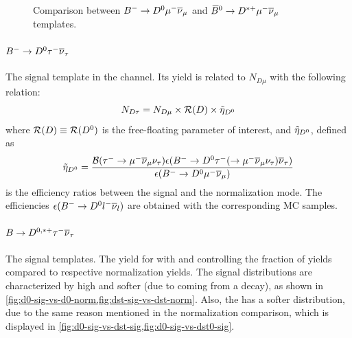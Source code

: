 \begin{figure}[!htb]
    \caption{
        Comparison between ${{{B}^-}} \rightarrow {\ensuremath{{D}^0}}{\ensuremath{\mu^-}}{\ensuremath{{\overline{\nu}}_\mu}}$ and
        ${{\kern 0.18em\overline{\kern -0.18em B}}{}^0} \rightarrow {\ensuremath{{D}^{*+}}}{\ensuremath{\mu^-}}{\ensuremath{{\overline{\nu}}_\mu}}$ templates.
    }
    \label{fig:d0-norm-vs-dst-norm}
\end{figure}

\paragraph{${{{B}^-}} \rightarrow {\ensuremath{{D}^0}}{\ensuremath{\tau^-}}{\ensuremath{{\overline{\nu}}_\tau}}$}
The signal template in the \Dz channel.
Its yield is related to $N_{D\mu}$ with the following relation:
\begin{equation}
    N_{D\tau} = N_{D\mu} \times \mathcal{R}(D) \times \tilde{\eta}_{{{D}^0}}
\end{equation}
where $\mathcal{R}(D) \equiv \mathcal{R}({{D}^0})$ is the free-floating parameter of interest,
and $\tilde{\eta}_{{{D}^0}}$, defined as
\begin{equation}
    \tilde{\eta}_{\Dz} = \frac{
        \mathcal{B}(\taum \rightarrow \mun\neumb\neut)
        \epsilon{(\Bm \rightarrow \Dz \taum (\rightarrow \mun\neumb\neut) \neutb)}
    }{
        \epsilon({\Bm \rightarrow \Dz \mun \neumb})
    }
\end{equation}
is the efficiency ratios between the signal and the normalization mode.
The efficiencies $\epsilon({{{{B}^-}} \rightarrow {\ensuremath{{D}^0}} {\ensuremath{l^-}} {\ensuremath{{\overline{\nu}}_l}}})$ are
obtained with the corresponding MC samples.

\paragraph{$B \rightarrow D^{0,*+}{\tau^-}{{\overline{\nu}}_\tau}$}
The signal templates.
The yield for
with \RD and \RDstp controlling the fraction
of yields compared to respective normalization yields.
The signal distributions are characterized by high \mmSq and softer
\el (due to \muon coming from a \tauon decay),
as shown in \cref{fig:d0-sig-vs-d0-norm,fig:dst-sig-vs-dst-norm}.
Also, the \Dz\tauon has a softer \qSq distribution, due to the same reason
mentioned in the normalization comparison, which is displayed in
\cref{fig:d0-sig-vs-dst-sig,fig:d0-sig-vs-dst0-sig}.

